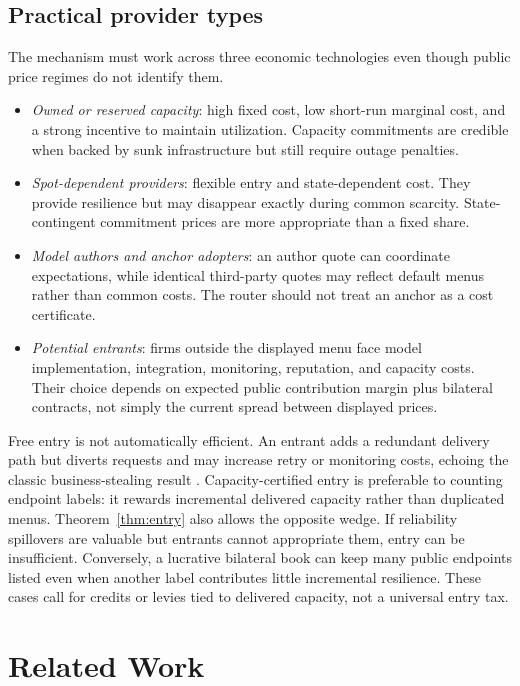 \documentclass[sigconf,nonacm]{acmart}
\newcommand{\1}{\mathbf 1}
\begin{document}
\subsection{Practical provider types}

The mechanism must work across three economic technologies even though public
price regimes do not identify them.

\begin{itemize}[leftmargin=*,nosep]
\item \emph{Owned or reserved capacity}: high fixed cost, low short-run marginal
cost, and a strong incentive to maintain utilization.  Capacity commitments are
credible when backed by sunk infrastructure but still require outage penalties.
\item \emph{Spot-dependent providers}: flexible entry and state-dependent cost.
They provide resilience but may disappear exactly during common scarcity.
State-contingent commitment prices are more appropriate than a fixed share.
\item \emph{Model authors and anchor adopters}: an author quote can coordinate
expectations, while identical third-party quotes may reflect default menus rather
than common costs.  The router should not treat an anchor as a cost certificate.
\item \emph{Potential entrants}: firms outside the displayed menu face model
implementation, integration, monitoring, reputation, and capacity costs.  Their
choice depends on expected public contribution margin plus bilateral contracts,
not simply the current spread between displayed prices.
\end{itemize}

Free entry is not automatically efficient.  An entrant adds a redundant delivery
path but diverts requests and may increase retry or monitoring costs, echoing the
classic business-stealing result \cite{mankiw1986freeentry}.  Capacity-certified
entry is preferable to counting endpoint labels: it rewards incremental delivered
capacity rather than duplicated menus.  Theorem~\ref{thm:entry} also allows the
opposite wedge.  If reliability spillovers are valuable but entrants cannot
appropriate them, entry can be insufficient.  Conversely, a lucrative bilateral
book can keep many public endpoints listed even when another label contributes
little incremental resilience.  These cases call for credits or levies tied to
delivered capacity, not a universal entry tax.

\section{Related Work}
\end{document}
